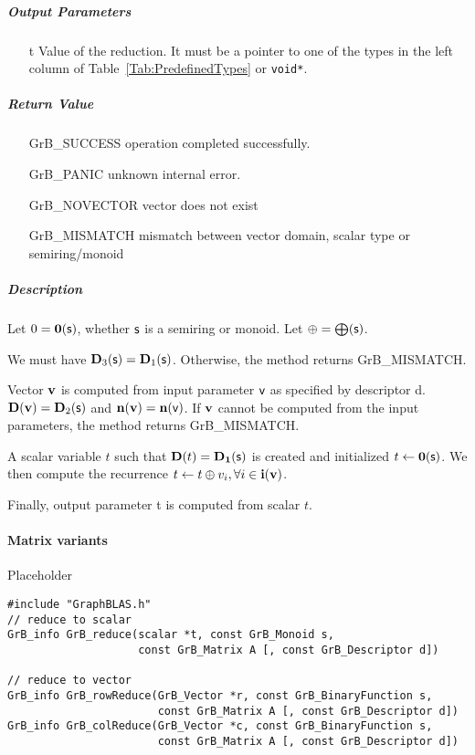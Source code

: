 \subparagraph{Output Parameters}

\begin{itemize}
	\item[{\sf t}] Value of the reduction. It must
	be a pointer to one of the types in 
	the left column of Table~\ref{Tab:PredefinedTypes} or
	{\tt void*}.
\end{itemize}

\subparagraph{Return Value}

\begin{itemize}[leftmargin=2.1in]
\item[{\sf GrB\_SUCCESS}] 	operation completed successfully.
\item[{\sf GrB\_PANIC}]	    unknown internal error.
\item[{\sf GrB\_NOVECTOR}]	vector does not exist
\item[{\sf GrB\_MISMATCH}]	mismatch between vector domain, scalar type or semiring/monoid
\end{itemize}

\subparagraph{Description}

Let $0 = \bold{0}({\sf s})$, whether ${\sf s}$ is a semiring or monoid.
Let $\oplus = \bigoplus({\sf s})$.

We must have $\bold{D}_3({\sf s}) = \bold{D}_1({\sf s})$.
Otherwise, the method returns {\sf GrB\_MISMATCH}.

Vector ${\bf v}$ is computed from input parameter ${\sf v}$ as
specified by descriptor {\sf d}. $\bold{D}({\bf v}) = \bold{D}_2({\sf s})$
and $\bold{n}({\bf v}) = \bold{n}({\sf v})$. If ${\bf v}$ cannot be computed
from the input parameters, the method returns {\sf GrB\_MISMATCH}.

A scalar variable $t$ such that $\bold{D}(t) = \bold{D_1}({\sf s})$ is
created and initialized $t \leftarrow \bold{0}({\sf s})$. 
We then compute the recurrence $t \leftarrow t \oplus v_i, \forall i \in {\bf i}({\bf v})$.

Finally, output parameter {\sf t} is computed from scalar $t$.

\paragraph{Matrix variants}

Placeholder


\begin{verbatim}
#include "GraphBLAS.h"
// reduce to scalar
GrB_info GrB_reduce(scalar *t, const GrB_Monoid s,
                    const GrB_Matrix A [, const GrB_Descriptor d])

// reduce to vector
GrB_info GrB_rowReduce(GrB_Vector *r, const GrB_BinaryFunction s,
                       const GrB_Matrix A [, const GrB_Descriptor d])
GrB_info GrB_colReduce(GrB_Vector *c, const GrB_BinaryFunction s,
                       const GrB_Matrix A [, const GrB_Descriptor d])
\end{verbatim}

